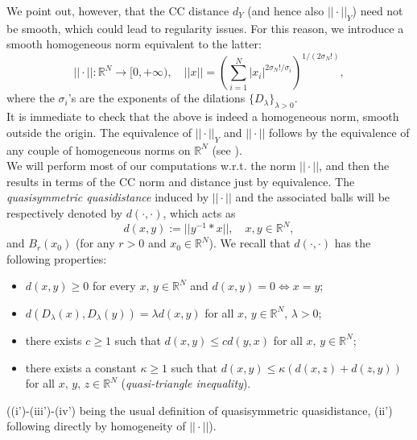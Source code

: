 \documentclass{article}
\numberwithin{equation}{section}
\begin{document}
\vspace{2mm}

\hspace{-7mm}
 We point out, however, that the CC distance $d_Y$ (and hence also $||\cdot||_Y$) need not be smooth, which could lead to regularity issues. For this reason, we introduce a smooth homogeneous norm equivalent to the latter:
\begin{equation}
\label{smooth homogeneous norm}
    ||\cdot|| : \mathbb{R}^N \to [0,+\infty), \quad ||x||=\left(  \sum_{i=1}^{N}|x_{i}|^{2\sigma_{N}!/\sigma_{i}}\right)  ^{1/(2\sigma_{N}!)},
\end{equation}
where the $\sigma_i$'s are the exponents of the dilations $\{D_{\lambda}\}_{\lambda>0}$. \\It is immediate to check that the above is indeed a homogeneous norm, smooth outside the origin. The equivalence of $||\cdot||_Y$ and $||\cdot||$ follows by the equivalence of any couple of homogeneous norms on $\mathbb{R}^N$ (see \cite[Theorem 3.12]{librone}).\\
We will perform most of our computations w.r.t. the norm $||\cdot||$, and then  the results in terms of the CC norm and distance just by equivalence. The \emph{quasisymmetric quasidistance} induced by $||\cdot||$ and the associated balls will be respectively denoted by $d(\cdot,\cdot)$, which acts as 
\begin{equation*}
    d(x,y):=||y^{-1}*x||, \quad x,y \in \mathbb{R}^N,
\end{equation*}
and $B_r(x_0)$ (for any $r>0$ and $x_0 \in \mathbb{R}^N$).
We recall that $d(\cdot,\cdot)$ has the following properties:
\begin{itemize}
    \item [(i')] $d(x,y) \geq 0$ for every $x, \, y \in \mathbb{R}^N$ and $d(x,y)=0 \iff x=y$;
    \item [(ii')] $d(D_{\lambda}(x), D_{\lambda}(y))=\lambda d(x,y)$ for all $x, \, y \in \mathbb{R}^N, \, \lambda>0$;
    \item [(iii')] there exists $c \geq 1$ such that $d(x,y) \leq c d(y,x)$ for all $x, \, y \in \mathbb{R}^N$;
    \item [(iv')] there exists a constant $\kappa \geq 1$ such that $d(x,y) \leq \kappa (d(x,z)+d(z,y))$ for all $x, \, y, \, z \in \mathbb{R}^N$ (\emph{quasi-triangle inequality}).
\end{itemize}
((i')-(iii')-(iv') being the usual definition of quasisymmetric quasidistance, (ii') following directly by homogeneity of $||\cdot||$).
\end{document}
